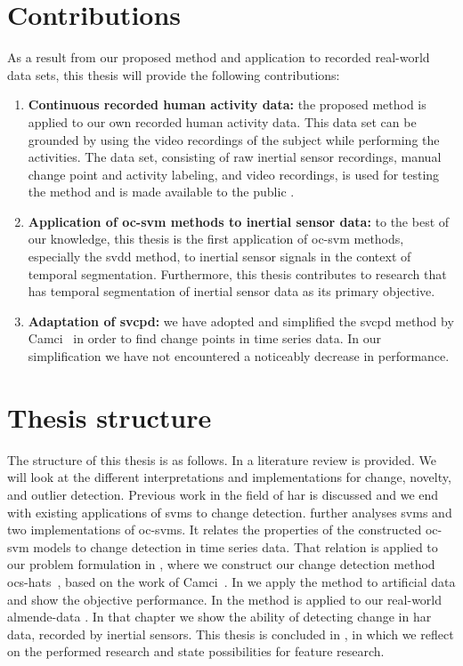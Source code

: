 \section{Contributions}\label{sec:intro_contributions}
As a result from our proposed method and application to recorded real-world data sets, this thesis will provide the following contributions:
\begin{enumerate}
  \item \textbf{Continuous recorded human activity data:} the proposed method is applied to our own recorded human activity data.
  This data set can be grounded by using the video recordings of the subject while performing the activities.
  The data set, consisting of raw inertial sensor recordings, manual change point and activity labeling, and video recordings, is used for testing the method and is made available to the public \cite{vlasveld2014acras}.
  \item \textbf{Application of \gls{oc-svm} methods to inertial sensor data:} to the best of our knowledge, this thesis is the first application of \gls{oc-svm} methods, especially the \gls{svdd} method, to inertial sensor signals in the context of temporal segmentation.
  Furthermore, this thesis contributes to research that has temporal segmentation of inertial sensor data as its primary objective.
  \item \textbf{Adaptation of \acrshort{svcpd}:} we have adopted and simplified the \acrshort{svcpd} method by Camci~\cite{camci2010change} in order to find change points in time series data.
  In our simplification we have not encountered a noticeably decrease in performance.
\end{enumerate}

\section{Thesis structure}\label{sec:intro_thesis_structure}
The structure of this thesis is as follows.
In  a literature review is provided.
We will look at the different interpretations and implementations for change, novelty, and outlier detection.
Previous work in the field of \gls{har} is discussed and we end with existing applications of \glspl{svm} to change detection.
 further analyses \glspl{svm} and two implementations of \glspl{oc-svm}.
It relates the properties of the constructed \gls{oc-svm} models to change detection in time series data.
That relation is applied to our problem formulation in , where we construct our change detection method \gls{ocs-hats}~\cite{vlasveld2014hats}, based on the work of Camci~\cite{camci2010change}.
In  we apply the method to artificial data and show the objective performance.
In  the method is applied to our real-world \gls{almende-data} \cite{vlasveld2014acras}.
In that chapter we show the ability of detecting change in \gls{har} data, recorded by inertial sensors.
This thesis is concluded in , in which we reflect on the performed research and state possibilities for feature research.